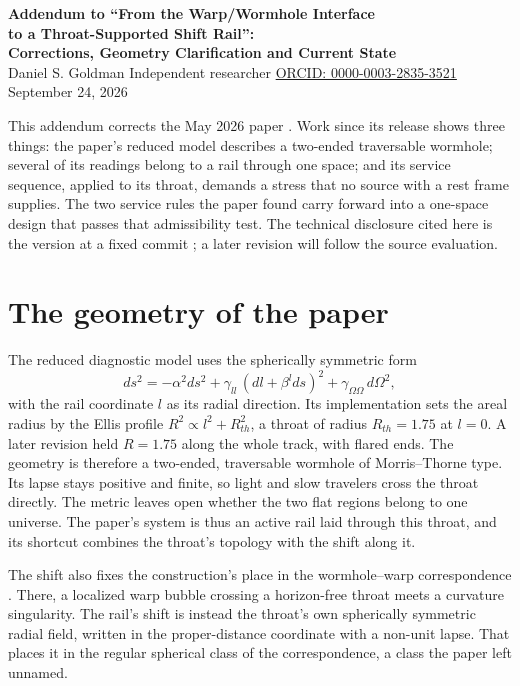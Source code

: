 \documentclass[10pt]{article}
\begin{document}
\begin{center}
{\large\bfseries Addendum to ``From the Warp/Wormhole Interface\\[1pt]
to a Throat-Supported Shift Rail'':\\[3pt]
Corrections, Geometry Clarification and Current State}\\[6pt]
Daniel S. Goldman \quad Independent researcher \quad
\href{https://orcid.org/0000-0003-2835-3521}{ORCID: 0000-0003-2835-3521}\\[1pt]
September 24, 2026
\end{center}

This addendum corrects the May 2026 paper \cite{rail}. Work since its release shows three things: the paper's reduced
model describes a two-ended traversable wormhole; several of its readings belong to a rail through one space; and its
service sequence, applied to its throat, demands a stress that no source with a rest frame supplies. The two service
rules the paper found carry forward into a one-space design that passes that admissibility test. The technical
disclosure cited here is the version at a fixed commit \cite{disclosure}; a later revision will follow the source
evaluation.

\section{The geometry of the paper}

The reduced diagnostic model uses the spherically symmetric form
\[
ds^2=-\alpha^2ds^2+\gamma_{ll}\,(dl+\beta^l ds)^2+\gamma_{\Omega\Omega}\,d\Omega^2 ,
\]
with the rail coordinate $l$ as its radial direction. Its implementation sets the areal radius by the Ellis profile
$R^2\propto l^2+R_{th}^2$, a throat of radius $R_{th}=1.75$ at $l=0$. A later revision held $R=1.75$ along the whole
track, with flared ends. The geometry is therefore a two-ended, traversable wormhole of Morris--Thorne type. Its lapse
stays positive and finite, so light and slow travelers cross the throat directly. The metric leaves open whether the two
flat regions belong to one universe. The paper's system is thus an active rail laid through this throat, and its
shortcut combines the throat's topology with the shift along it.

The shift also fixes the construction's place in the wormhole--warp correspondence \cite{gz}. There, a localized warp
bubble crossing a horizon-free throat meets a curvature singularity. The rail's shift is instead the throat's own
spherically symmetric radial field, written in the proper-distance coordinate with a non-unit lapse. That places it in the
regular spherical class of the correspondence, a class the paper left unnamed.
\end{document}
